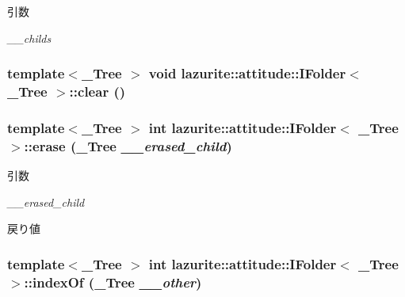 \begin{DoxyParams}{引数}
\item[{\em \_\-\_\-childs}]\end{DoxyParams}
\hypertarget{interfacelazurite_1_1attitude_1_1_i_folder_3_01___tree_01_4_ab9a3cc318157678ab67c0e7dc27947e1}{
\subsubsection[{clear}]{\setlength{\rightskip}{0pt plus 5cm}template$<$\_\-Tree $>$ void lazurite::attitude::IFolder$<$ \_\-Tree $>$::clear ()}}
\label{interfacelazurite_1_1attitude_1_1_i_folder_3_01___tree_01_4_ab9a3cc318157678ab67c0e7dc27947e1}
\hypertarget{interfacelazurite_1_1attitude_1_1_i_folder_3_01___tree_01_4_a0eba789ef4a1d6b3dafc552b12724a62}{
\subsubsection[{erase}]{\setlength{\rightskip}{0pt plus 5cm}template$<$\_\-Tree $>$ int lazurite::attitude::IFolder$<$ \_\-Tree $>$::erase (\_\-Tree {\em \_\-\_\-erased\_\-child})}}
\label{interfacelazurite_1_1attitude_1_1_i_folder_3_01___tree_01_4_a0eba789ef4a1d6b3dafc552b12724a62}

\begin{DoxyParams}{引数}
\item[{\em \_\-\_\-erased\_\-child}]\end{DoxyParams}
\begin{DoxyReturn}{戻り値}

\end{DoxyReturn}
\hypertarget{interfacelazurite_1_1attitude_1_1_i_folder_3_01___tree_01_4_ab1db0492dcf23ba9472059dc63cbf636}{
\subsubsection[{indexOf}]{\setlength{\rightskip}{0pt plus 5cm}template$<$\_\-Tree $>$ int lazurite::attitude::IFolder$<$ \_\-Tree $>$::indexOf (\_\-Tree {\em \_\-\_\-other})}}
\label{interfacelazurite_1_1attitude_1_1_i_folder_3_01___tree_01_4_ab1db0492dcf23ba9472059dc63cbf636}

